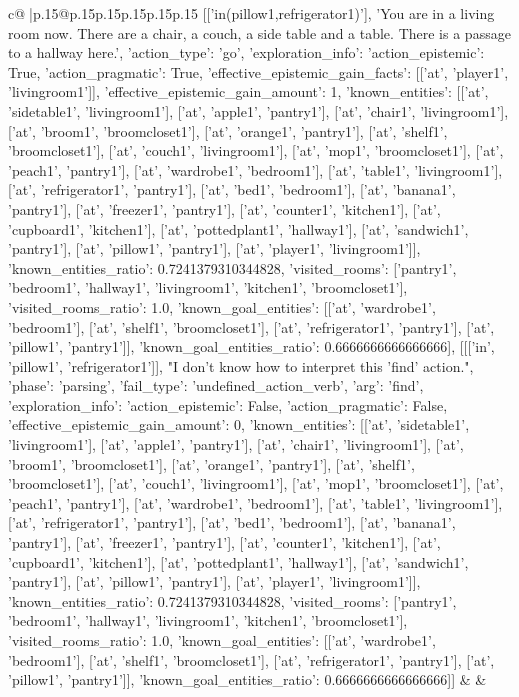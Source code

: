\documentclass{article}
\begin{document}
{\begin{supertabular}{c@{$\;$}|p{.15\linewidth}@{}p{.15\linewidth}p{.15\linewidth}p{.15\linewidth}p{.15\linewidth}p{.15\linewidth}}
{{{[['in(pillow1,refrigerator1)'], 'You are in a living room now. There are a chair, a couch, a side table and a table. There is a passage to a hallway here.', {'action_type': 'go', 'exploration_info': {'action_epistemic': True, 'action_pragmatic': True, 'effective_epistemic_gain_facts': [['at', 'player1', 'livingroom1']], 'effective_epistemic_gain_amount': 1, 'known_entities': [['at', 'sidetable1', 'livingroom1'], ['at', 'apple1', 'pantry1'], ['at', 'chair1', 'livingroom1'], ['at', 'broom1', 'broomcloset1'], ['at', 'orange1', 'pantry1'], ['at', 'shelf1', 'broomcloset1'], ['at', 'couch1', 'livingroom1'], ['at', 'mop1', 'broomcloset1'], ['at', 'peach1', 'pantry1'], ['at', 'wardrobe1', 'bedroom1'], ['at', 'table1', 'livingroom1'], ['at', 'refrigerator1', 'pantry1'], ['at', 'bed1', 'bedroom1'], ['at', 'banana1', 'pantry1'], ['at', 'freezer1', 'pantry1'], ['at', 'counter1', 'kitchen1'], ['at', 'cupboard1', 'kitchen1'], ['at', 'pottedplant1', 'hallway1'], ['at', 'sandwich1', 'pantry1'], ['at', 'pillow1', 'pantry1'], ['at', 'player1', 'livingroom1']], 'known_entities_ratio': 0.7241379310344828, 'visited_rooms': ['pantry1', 'bedroom1', 'hallway1', 'livingroom1', 'kitchen1', 'broomcloset1'], 'visited_rooms_ratio': 1.0, 'known_goal_entities': [['at', 'wardrobe1', 'bedroom1'], ['at', 'shelf1', 'broomcloset1'], ['at', 'refrigerator1', 'pantry1'], ['at', 'pillow1', 'pantry1']], 'known_goal_entities_ratio': 0.6666666666666666}}], [[['in', 'pillow1', 'refrigerator1']], "I don't know how to interpret this 'find' action.", {'phase': 'parsing', 'fail_type': 'undefined_action_verb', 'arg': 'find', 'exploration_info': {'action_epistemic': False, 'action_pragmatic': False, 'effective_epistemic_gain_amount': 0, 'known_entities': [['at', 'sidetable1', 'livingroom1'], ['at', 'apple1', 'pantry1'], ['at', 'chair1', 'livingroom1'], ['at', 'broom1', 'broomcloset1'], ['at', 'orange1', 'pantry1'], ['at', 'shelf1', 'broomcloset1'], ['at', 'couch1', 'livingroom1'], ['at', 'mop1', 'broomcloset1'], ['at', 'peach1', 'pantry1'], ['at', 'wardrobe1', 'bedroom1'], ['at', 'table1', 'livingroom1'], ['at', 'refrigerator1', 'pantry1'], ['at', 'bed1', 'bedroom1'], ['at', 'banana1', 'pantry1'], ['at', 'freezer1', 'pantry1'], ['at', 'counter1', 'kitchen1'], ['at', 'cupboard1', 'kitchen1'], ['at', 'pottedplant1', 'hallway1'], ['at', 'sandwich1', 'pantry1'], ['at', 'pillow1', 'pantry1'], ['at', 'player1', 'livingroom1']], 'known_entities_ratio': 0.7241379310344828, 'visited_rooms': ['pantry1', 'bedroom1', 'hallway1', 'livingroom1', 'kitchen1', 'broomcloset1'], 'visited_rooms_ratio': 1.0, 'known_goal_entities': [['at', 'wardrobe1', 'bedroom1'], ['at', 'shelf1', 'broomcloset1'], ['at', 'refrigerator1', 'pantry1'], ['at', 'pillow1', 'pantry1']], 'known_goal_entities_ratio': 0.6666666666666666}}]] 
	  } 
	   } 
	   } 
	 & & \\ 
 


\end{supertabular}}
\end{document}
